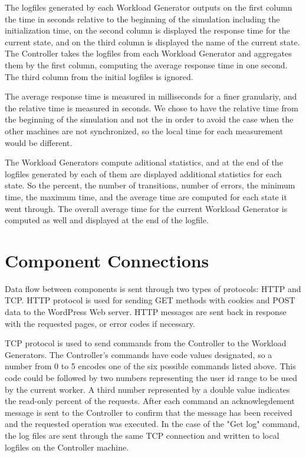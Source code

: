 The logfiles generated by each Workload Generator outputs on the first column the time in seconds relative to the beginning of the simulation including the initialization time, on the second column is displayed the response time for the current state, and on the third column is displayed the name of the current state. The Controller takes the logfiles from each Workload Generator and aggregates them by the first column, computing the average response time in one second. The third column from the initial logfiles is ignored.

The average response time is measured in milliseconds for a finer granulariy, and the relative time is measured in seconds. We chose to have the relative time from the beginning of the simulation and not the in order to avoid the case when the other machines are not synchronized, so the local time for each measurement would be different.

The Workload Generators compute aditional statistics, and at the end of the logfiles generated by each of them are displayed additional statistics for each state. So the percent, the number of transitions, number of errors, the minimum time, the maximum time, and the average time are computed for each state it went through. The overall average time for the current Workload Generator is computed as well and displayed at the end of the logfile.

\section{Component Connections}
\label{sec:component-connections}

Data flow between components is sent through two types of protocols: HTTP and TCP. HTTP protocol is used for sending GET methods with cookies and POST data to the WordPress Web server. HTTP messages are sent back in response with the requested pages, or error codes if necessary. 

TCP protocol is used to send commands from the Controller to the Workload Generators. The Controller's commands have code values designated, so a number from 0 to 5 encodes one of the six possible commands listed above. This code could be followed by two numbers representing the user id range to be used by the current worker. A third number represented by a double value indicates the read-only percent of the requests. After each command an acknowlegdement message is sent to the Controller to confirm that the message has been received and the requested operation was executed. In the case of the "Get log" command, the log files are sent through the same TCP connection and written to local logfiles on the Controller machine. 

